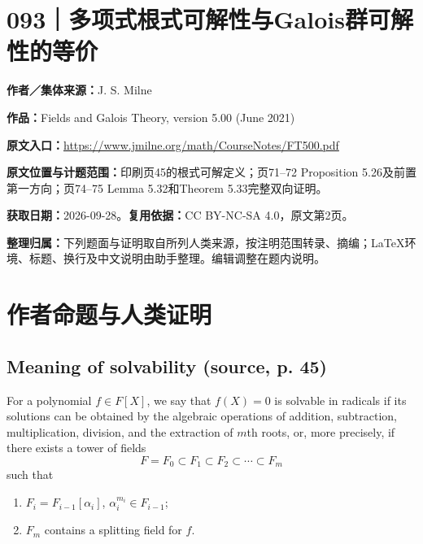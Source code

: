 \documentclass[UTF8,11pt,a4paper]{ctexart}
\theoremstyle{definition}\newtheorem*{definition}{Definition}
\theoremstyle{remark}\newtheorem*{remark}{Remark}
\begin{document}
\section*{093｜多项式根式可解性与Galois群可解性的等价}
\textbf{作者／集体来源：}J. S. Milne

\textbf{作品：}Fields and Galois Theory, version 5.00 (June 2021)

\textbf{原文入口：}\url{https://www.jmilne.org/math/CourseNotes/FT500.pdf}

\textbf{原文位置与计题范围：}印刷页45的根式可解定义；页71--72 Proposition 5.26及前置第一方向；页74--75 Lemma 5.32和Theorem 5.33完整双向证明。

\textbf{获取日期：}2026-09-28。\quad\textbf{复用依据：}CC BY-NC-SA 4.0，原文第2页。

\textbf{整理归属：}下列题面与证明取自所列人类来源，按注明范围转录、摘编；LaTeX环境、标题、换行及中文说明由助手整理。编辑调整在题内说明。

\section*{作者命题与人类证明}

\subsection*{Meaning of solvability (source, p. 45)}
For a polynomial $f\in F[X]$, we say that $f(X)=0$ is solvable in radicals if its solutions can be obtained by the algebraic operations of addition, subtraction, multiplication, division, and the extraction of $m$th roots, or, more precisely, if there exists a tower of fields
\[
F=F_0\subset F_1\subset F_2\subset\cdots\subset F_m
\]
such that
\begin{enumerate}[label=(\alph*)]
\item $F_i=F_{i-1}[\alpha_i]$, $\alpha_i^{m_i}\in F_{i-1}$;
\item $F_m$ contains a splitting field for $f$.
\end{enumerate}
\end{document}
